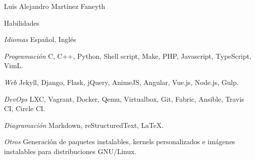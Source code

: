 \documentclass[10pt,letterpaper]{article}
\begin{document}
\begin{cv}{Luis Alejandro Mart\'inez Faneyth}
\begin{cvlist}{Habilidades}
\item[\textit{\large{Idiomas}}]{Espa\~nol, Ingl\'es}
\item[\textit{\large{Programaci\'on}}]{C, C++, Python, Shell script, Make, PHP, Javascript, TypeScript, VimL.}
\item[\textit{\large{Web}}]{Jekyll, Django, Flask, jQuery, AnimeJS, Angular, Vue.js, Node.js, Gulp.}
\item[\textit{\large{DevOps}}]{LXC, Vagrant, Docker, Qemu, Virtualbox, Git, Fabric, Ansible, Travis CI, Circle CI.}
\item[\textit{\large{Diagramaci\'on}}]{Markdown, reStructuredText, \LaTeX.}
\item[\textit{\large{Otros}}]{
	Generaci\'on de paquetes instalables, kernels personalizados e im\'agenes instalables para distribuciones GNU/Linux.\\
}
\end{cvlist}

\end{cv}
\end{document}
